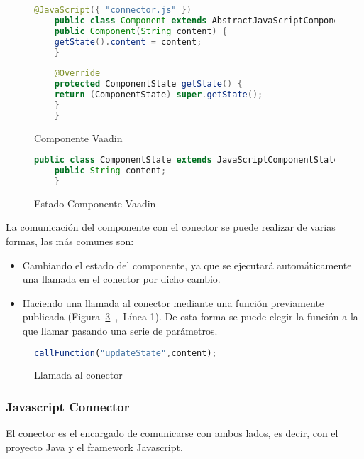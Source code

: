 \begin{figure}[!tb]
	\centering
	\begin{lstlisting}[language=Java]
	@JavaScript({ "connector.js" })
	public class Component extends AbstractJavaScriptComponent {
	public Component(String content) {
	getState().content = content;
	}
	
	@Override
	protected ComponentState getState() {
	return (ComponentState) super.getState();
	}
	}
	\end{lstlisting}
	\caption{Componente Vaadin}
	\label{fig:componenteVaadin}
\end{figure}


\begin{figure}[!tb]
	\centering
	\begin{lstlisting}[language=Java]
	public class ComponentState extends JavaScriptComponentState {
	public String content;
	}
	\end{lstlisting}
	\caption{Estado Componente Vaadin}
	\label{fig:estadoComponenteVaadin}
\end{figure}


La comunicación del componente con el conector se puede realizar de varias formas, las más comunes son:
\begin{itemize}
	\item  Cambiando el estado del componente, ya que se ejecutará automáticamente una llamada en el conector por dicho cambio.
	\item  Haciendo una llamada al conector mediante una función previamente publicada (Figura~\ref{fig:callfunction}~,~Línea 1). De esta forma se puede elegir la función a la que llamar pasando una serie de parámetros.
\end{itemize}

\begin{figure}[!tb]
	\centering
	\begin{lstlisting}[language=JavaScript]
	callFunction("updateState",content);
	\end{lstlisting}
	\caption{Llamada al conector}
	\label{fig:callfunction}
\end{figure}



\subsubsection{Javascript Connector}	


El conector es el encargado de comunicarse con ambos lados, es decir, con el proyecto Java y el framework Javascript.

